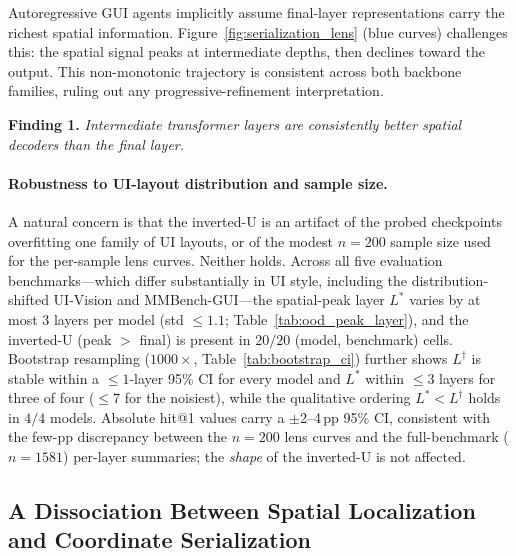 Autoregressive GUI agents implicitly assume final-layer representations carry the richest spatial information.
Figure~\ref{fig:serialization_lens} (blue curves) challenges this: the spatial signal peaks at intermediate depths, then declines toward the output.
This non-monotonic trajectory is consistent across both backbone families, ruling out any progressive-refinement interpretation.

\begin{tcolorbox}[colback=gray!8, colframe=gray!40, boxrule=0.4pt, arc=2pt, left=4pt, right=4pt, top=3pt, bottom=3pt]
\textbf{Finding 1.}
\emph{Intermediate transformer layers are consistently better spatial decoders than the final layer.}
\end{tcolorbox}

\paragraph{Robustness to UI-layout distribution and sample size.}
A natural concern is that the inverted-U is an artifact of the probed checkpoints overfitting one family of UI layouts, or of the modest $n{=}200$ sample size used for the per-sample lens curves.
Neither holds.
Across all five evaluation benchmarks---which differ substantially in UI style, including the distribution-shifted UI-Vision and MMBench-GUI---the spatial-peak layer $L^*$ varies by at most $3$ layers per model (std $\le 1.1$; Table~\ref{tab:ood_peak_layer}), and the inverted-U (peak $>$ final) is present in $20/20$ (model, benchmark) cells.
Bootstrap resampling ($1000\times$, Table~\ref{tab:bootstrap_ci}) further shows $L^\dagger$ is stable within a $\le 1$-layer 95\% CI for every model and $L^*$ within $\le 3$ layers for three of four ($\le 7$ for the noisiest), while the qualitative ordering $L^* < L^\dagger$ holds in $4/4$ models.
Absolute hit@1 values carry a $\pm$2--4\,pp 95\% CI, consistent with the few-pp discrepancy between the $n{=}200$ lens curves and the full-benchmark ($n{=}1581$) per-layer summaries; the \emph{shape} of the inverted-U is not affected.

\subsection{A Dissociation Between Spatial Localization and Coordinate Serialization}
\label{sec:analysis:serialization}

